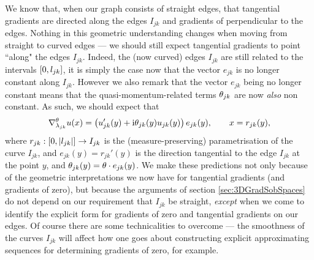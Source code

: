 We know that, when our graph consists of straight edges, that tangential gradients are directed along the edges $I_{jk}$ and gradients of perpendicular to the edges.
Nothing in this geometric understanding changes when moving from straight to curved edges --- we should still expect tangential gradients to point ``along" the edges $I_{jk}$.
Indeed, the (now curved) edges $I_{jk}$ are still related to the intervals $\left[ 0,l_{jk} \right]$, it is simply the case now that the vector $e_{jk}$ is no longer constant along $I_{jk}$.
However we also remark that the vector $e_{jk}$ being no longer constant means that the quasi-momentum-related terms $\theta_{jk}$ are now \emph{also} non constant.
As such, we should expect that
\begin{align*}
	\nabla^{\theta}_{\lambda_{jk}}u(x) = \left(  u_{jk}'(y) + \mathrm{i}\theta_{jk}(y) u_{jk}(y) \right)e_{jk}(y),
	\qquad x = r_{jk}(y),
\end{align*}
where $r_{jk}:\left[ 0,\left\lvert l_{jk} \right\rvert \right]\rightarrow I_{jk}$ is the (measure-preserving) parametrisation of the curve $I_{jk}$, and $e_{jk}(y) = r_{jk}'(y)$ is the direction tangential to the edge $I_{jk}$ at the point $y$, and $\theta_{jk}(y)=\theta\cdot e_{jk}(y)$.
We make these predictions not only because of the geometric interpretations we now have for tangential gradients (and gradients of zero), but because the arguments of section \ref{sec:3DGradSobSpaces} do not depend on our requirement that $I_{jk}$ be straight, \emph{except} when we come to identify the explicit form for gradients of zero and tangential gradients on our edges.
Of course there are some technicalities to overcome --- the smoothness of the curves $I_{jk}$ will affect how one goes about constructing explicit approximating sequences for determining gradients of zero, for example.

